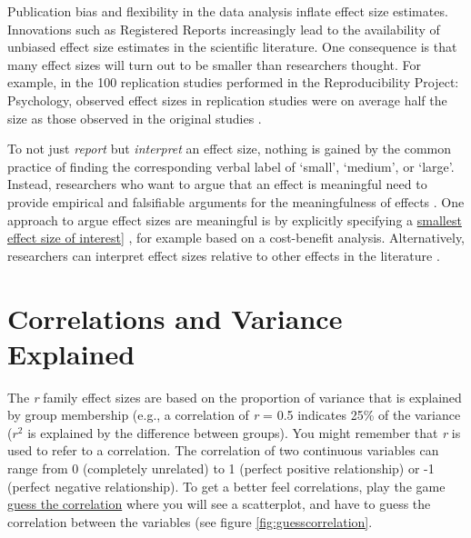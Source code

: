 \documentclass[
  oneside]{book}
\begin{document}
Publication bias and flexibility in the data analysis inflate effect size estimates. Innovations such as Registered Reports \citep{chambers_past_2022, nosek_registered_2014} increasingly lead to the availability of unbiased effect size estimates in the scientific literature. One consequence is that many effect sizes will turn out to be smaller than researchers thought. For example, in the 100 replication studies performed in the Reproducibility Project: Psychology, observed effect sizes in replication studies were on average half the size as those observed in the original studies \citep{open_science_collaboration_estimating_2015}.

To not just \emph{report} but \emph{interpret} an effect size, nothing is gained by the common practice of finding the corresponding verbal label of `small', `medium', or `large'. Instead, researchers who want to argue that an effect is meaningful need to provide empirical and falsifiable arguments for the meaningfulness of effects \citep{primbs_are_2022, anvari_not_2021}. One approach to argue effect sizes are meaningful is by explicitly specifying a \protect\hyperlink{sesoi}{smallest effect size of interest}{]} \citep{gotz_small_2022}, for example based on a cost-benefit analysis. Alternatively, researchers can interpret effect sizes relative to other effects in the literature \citep{baguley_standardized_2009, funder_evaluating_2019}.

\hypertarget{correlations-and-variance-explained}{%
\section{Correlations and Variance Explained}\label{correlations-and-variance-explained}}

The \emph{r} family effect sizes are based on the proportion of variance that is explained by group membership (e.g., a correlation of \emph{r} = 0.5 indicates 25\% of the variance (\(r^2\) is explained by the difference between groups). You might remember that \emph{r} is used to refer to a correlation. The correlation of two continuous variables can range from 0 (completely unrelated) to 1 (perfect positive relationship) or -1 (perfect negative relationship). To get a better feel correlations, play the game \href{http://guessthecorrelation.com/}{guess the correlation} where you will see a scatterplot, and have to guess the correlation between the variables (see figure \ref{fig:guesscorrelation}.
\end{document}
